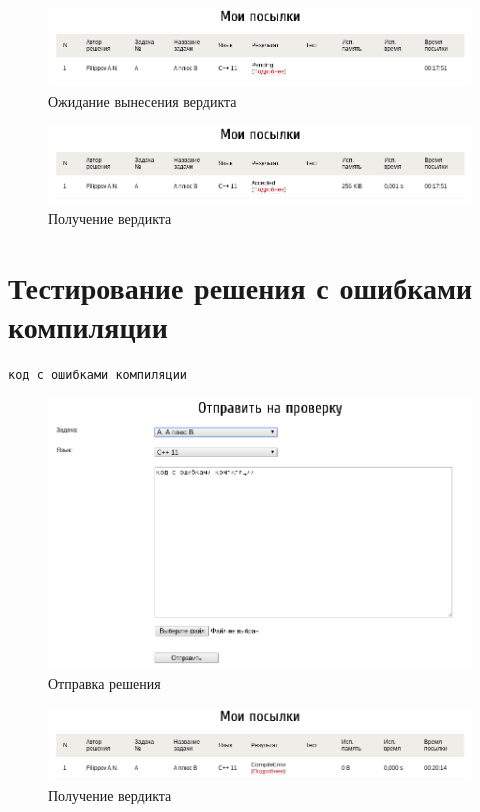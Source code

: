 \begin{figure}[H]
    \centering
    \includegraphics[width=0.8\columnwidth]{rs/mysubmitspending}
    \caption{Ожидание вынесения вердикта}
\end{figure}

\begin{figure}[H]
    \centering
    \includegraphics[width=0.8\columnwidth]{rs/mysubmitsok}
    \caption{Получение вердикта}
\end{figure}

\section{Тестирование решения с ошибками компиляции}
\begin{lstlisting}
код с ошибками компиляции
\end{lstlisting}

\begin{figure}[H]
    \centering
    \includegraphics[width=0.8\columnwidth]{rs/sendsubmitce}
    \caption{Отправка решения}
\end{figure}

\begin{figure}[H]
    \centering
    \includegraphics[width=0.8\columnwidth]{rs/mysubmitsce}
    \caption{Получение вердикта}
\end{figure}

